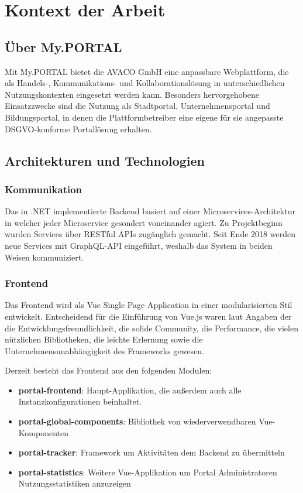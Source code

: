 \chapter{Kontext der Arbeit}
\label{chaKontext der Arbeit}
\section{Über My.PORTAL}
Mit My.PORTAL bietet die AVACO GmbH eine anpassbare Webplattform, die als Handels-,
Kommunikations- und Kollaborationslösung in unterschiedlichen Nutzungskontexten eingesetzt werden kann. Besonders hervorgehobene Einsatzzwecke sind die Nutzung als Stadtportal, Unternehmensportal und Bildungsportal, in denen die Plattformbetreiber eine eigene für sie angepasste DSGVO-konforme Portallösung erhalten. \citep{AVACOWebsite}

\section{Architekturen und Technologien}
\subsection{Kommunikation} %
Das in .NET implementierte Backend basiert auf einer Microservices-Architektur in welcher jeder Microservice gesondert voneinander agiert.  
Zu Projektbeginn wurden Services über RESTful APIs zugänglich gemacht. Seit Ende 2018 werden neue Services mit GraphQL-API eingeführt, weshalb das System in beiden Weisen kommuniziert.

\subsection{Frontend} %
Das Frontend wird als Vue Single Page Application in einer modularisierten Stil entwickelt. Entscheidend für die Einführung von Vue.js waren laut Angaben der \cite{FrontendDocumentation} die Entwicklungsfreundlichkeit, die solide Community, die Performance, die vielen nützlichen Bibliotheken, die leichte Erlernung sowie die Unternehmensunabhängigkeit des Frameworks gewesen.

Derzeit besteht das Frontend aus den folgenden Modulen:
\begin{itemize}
 \item \textbf{portal-frontend}: Haupt-Applikation, die außerdem auch alle Instanzkonfigurationen beinhaltet.
 \item \textbf{portal-global-components}: Bibliothek von wiederverwendbaren Vue-Komponenten
 \item \textbf{portal-tracker}: Framework um Aktivitäten dem Backend zu übermitteln
 \item \textbf{portal-statistics}: Weitere Vue-Applikation um Portal Administratoren Nutzungsstatistiken anzuzeigen
\end{itemize}
